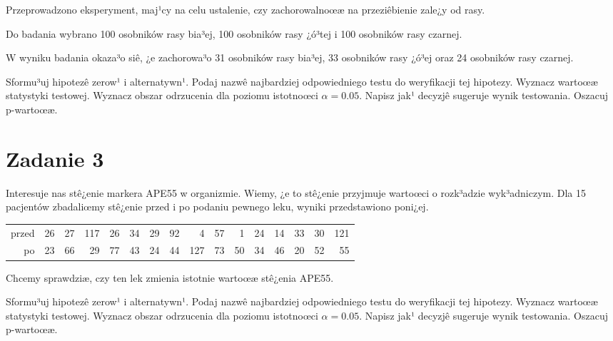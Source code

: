 \documentclass[a4paper,12pt]{article}
\begin{document}
  Przeprowadzono eksperyment, maj¹cy na celu ustalenie, czy zachorowalnoœæ na przeziêbienie zale¿y od rasy.
  
  Do badania wybrano 100 osobników rasy bia³ej, 100 osobników rasy ¿ó³tej i 100 osobników rasy czarnej. 
  
  W wyniku badania okaza³o siê, ¿e zachorowa³o 31 osobników rasy bia³ej, 33 osobników rasy ¿ó³ej oraz 24 osobników rasy czarnej. 
  
  Sformu³uj hipotezê zerow¹ i alternatywn¹. 
  Podaj nazwê najbardziej odpowiedniego testu do weryfikacji tej hipotezy. 
  Wyznacz wartoœæ statystyki testowej. 
  Wyznacz obszar odrzucenia dla poziomu istotnoœci $\alpha=0.05$. 
  Napisz jak¹ decyzjê sugeruje wynik testowania. Oszacuj p-wartoœæ. \vspace{1cm} 

  \section*{Zadanie 3}
     
  Interesuje nas stê¿enie markera APE55  w organizmie. 
  Wiemy, ¿e to stê¿enie przyjmuje wartoœci o rozk³adzie wyk³adniczym. 
  Dla 15 pacjentów zbadaliœmy stê¿enie przed i po podaniu pewnego leku, 
  wyniki przedstawiono poni¿ej.
  
  \vspace{0.5cm} 
  \noindent\begin{center} 
\begin{tabular}{rrrrrrrrrrrrrrrr}
  \hline
  \hline
przed & 26 & 27 & 117 & 26 & 34 & 29 & 92 & 4 & 57 & 1 & 24 & 14 & 33 & 30 & 121 \\
  po & 23 & 66 & 29 & 77 & 43 & 24 & 44 & 127 & 73 & 50 & 34 & 46 & 20 & 52 & 55 \\
   \hline
\end{tabular}
 
  \end{center} 
  \vspace{0.5cm}
  
  Chcemy sprawdziæ, czy ten lek zmienia istotnie wartoœæ stê¿enia APE55.
  
  Sformu³uj hipotezê zerow¹ i alternatywn¹. 
  Podaj nazwê najbardziej odpowiedniego testu do weryfikacji tej hipotezy. 
  Wyznacz wartoœæ statystyki testowej. 
  Wyznacz obszar odrzucenia dla poziomu istotnoœci $\alpha=0.05$. 
  Napisz jak¹ decyzjê sugeruje wynik testowania. Oszacuj p-wartoœæ. \vspace{1cm} 
\end{document}
